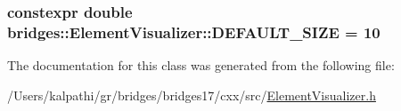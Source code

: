 \subsubsection[{D\+E\+F\+A\+U\+L\+T\+\_\+\+S\+I\+Z\+E}]{\setlength{\rightskip}{0pt plus 5cm}constexpr double bridges\+::\+Element\+Visualizer\+::\+D\+E\+F\+A\+U\+L\+T\+\_\+\+S\+I\+Z\+E = 10\hspace{0.3cm}{\ttfamily [static]}}\label{classbridges_1_1_element_visualizer_a81cc788d6149d5d582099cbc35e18c5a}


The documentation for this class was generated from the following file\+:\begin{DoxyCompactItemize}
\item 
/\+Users/kalpathi/gr/bridges/bridges17/cxx/src/\hyperlink{_element_visualizer_8h}{Element\+Visualizer.\+h}\end{DoxyCompactItemize}

